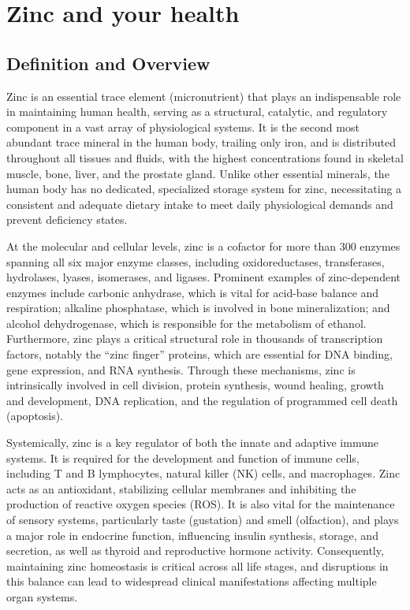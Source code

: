 \chapter{Zinc and your health}

\section*{Definition and Overview}
Zinc is an essential trace element (micronutrient) that plays an indispensable role in maintaining human health, serving as a structural, catalytic, and regulatory component in a vast array of physiological systems. It is the second most abundant trace mineral in the human body, trailing only iron, and is distributed throughout all tissues and fluids, with the highest concentrations found in skeletal muscle, bone, liver, and the prostate gland. Unlike other essential minerals, the human body has no dedicated, specialized storage system for zinc, necessitating a consistent and adequate dietary intake to meet daily physiological demands and prevent deficiency states.

At the molecular and cellular levels, zinc is a cofactor for more than 300 enzymes spanning all six major enzyme classes, including oxidoreductases, transferases, hydrolases, lyases, isomerases, and ligases. Prominent examples of zinc-dependent enzymes include carbonic anhydrase, which is vital for acid-base balance and respiration; alkaline phosphatase, which is involved in bone mineralization; and alcohol dehydrogenase, which is responsible for the metabolism of ethanol. Furthermore, zinc plays a critical structural role in thousands of transcription factors, notably the ``zinc finger'' proteins, which are essential for DNA binding, gene expression, and RNA synthesis. Through these mechanisms, zinc is intrinsically involved in cell division, protein synthesis, wound healing, growth and development, DNA replication, and the regulation of programmed cell death (apoptosis).

Systemically, zinc is a key regulator of both the innate and adaptive immune systems. It is required for the development and function of immune cells, including T and B lymphocytes, natural killer (NK) cells, and macrophages. Zinc acts as an antioxidant, stabilizing cellular membranes and inhibiting the production of reactive oxygen species (ROS). It is also vital for the maintenance of sensory systems, particularly taste (gustation) and smell (olfaction), and plays a major role in endocrine function, influencing insulin synthesis, storage, and secretion, as well as thyroid and reproductive hormone activity. Consequently, maintaining zinc homeostasis is critical across all life stages, and disruptions in this balance can lead to widespread clinical manifestations affecting multiple organ systems.

